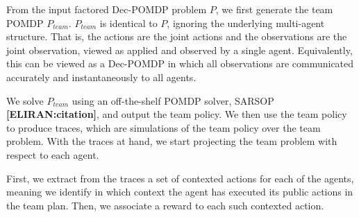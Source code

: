\documentclass[letterpaper]{article} %
\newcommand{\eliran}[1]{\textbf{[\color{red}ELIRAN:#1]}}
\begin{document}
From the input factored Dec-POMDP problem $P$, we first generate the team POMDP $P_{team}$. $P_{team}$ is identical to $P$, ignoring the underlying multi-agent structure. That is, the actions are the joint actions and the observations are the joint observation, viewed as applied 
and observed by a single agent. Equivalently, this can be viewed as a Dec-POMDP in which all observations are communicated accurately and instantaneously 
to all agents.

We solve $P_{team}$ using an off-the-shelf POMDP solver, SARSOP \cite{} \eliran{citation}, and output the team policy. We then use the team policy to produce traces, which are simulations of the team policy over the team problem. With the traces at hand, we start projecting the team problem with respect to each agent.

First, we extract from the traces a set of contexted actions for each of the agents, meaning we identify in which context the agent has executed its public actions in the team plan. Then, we associate a reward to each such contexted action.
\end{document}
